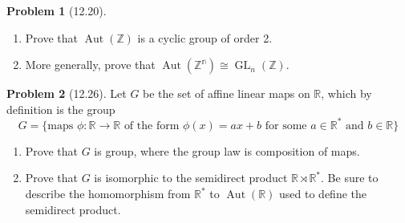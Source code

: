 \documentclass[12pt]{article}
\theoremstyle{definition}
\newtheorem{problem}{Problem}
\DeclareMathOperator{\Aut}{Aut}
\DeclareMathOperator{\GL}{GL}
\begin{document}
\begin{problem}[12.20] \phantom{.}
    \begin{enumerate}[label=(\alph*)]
        \item Prove that $\Aut(\mathbb{Z})$ is a cyclic group of order 2.
        \begin{solution}

        \end{solution}

        \item More generally, prove that $\Aut(\mathbb{Z^n}) \cong \GL_n(\mathbb{Z})$.
        \begin{solution}

        \end{solution}
    \end{enumerate}
\end{problem}

\begin{problem}[12.26]
    Let $G$ be the set of affine linear maps on $\mathbb{R}$, which by definition is the group
    \[
        G = \{ \text{maps } \phi : \mathbb{R} \longrightarrow \mathbb{R} \text{ of the form } \phi(x) = ax + b \text{ for some } a \in \mathbb{R}^* \text{ and } b \in \mathbb{R} \}
    \]
    \begin{enumerate}[label=(\alph*)]
        \item Prove that $G$ is group, where the group law is composition of maps.
        \begin{solution}

        \end{solution}

        \item Prove that $G$ is isomorphic to the semidirect product $\mathbb{R} \rtimes \mathbb{R}^*$.
              Be sure to describe the homomorphism from $\mathbb{R}^*$ to $\Aut(\mathbb{R})$ used to define
              the semidirect product.
        \begin{solution}

        \end{solution}
    \end{enumerate}
\end{problem}
\end{document}
